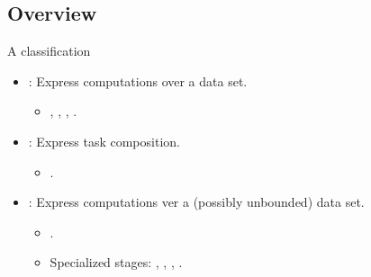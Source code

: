 \subsection{Overview}

\begin{frame}[t]{A classification}
\begin{itemize}
  \item {}: Express computations over a data set.
    \begin{itemize}
      \item {}, , , .
    \end{itemize}

  \vfill\pause
  \item {}: Express task composition.
    \begin{itemize}
      \item {}.
    \end{itemize}

  \vfill\pause
  \item {}: Express computations ver a (possibly unbounded) data set.
    \begin{itemize}
      \item {}.
      \item Specialized stages: , , 
            , .
    \end{itemize}
\end{itemize}
\end{frame}

